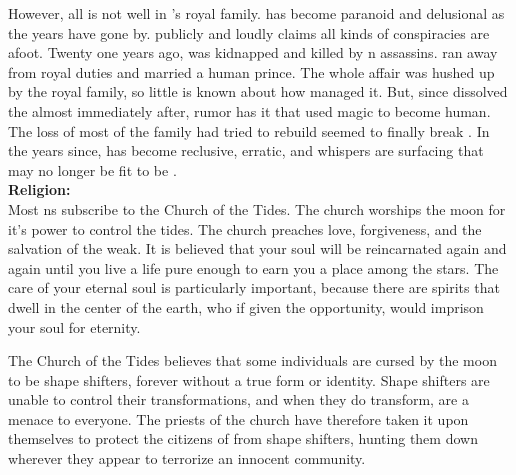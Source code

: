 \documentclass[blue]{NeptuneBall}
\begin{document}
However, all is not well in \pAtlantis{}'s royal family. \cPlant{\Prince} \cPlant{} has become paranoid and delusional as the years have gone by. \cPlant{\They} publicly and loudly claims all kinds of conspiracies are afoot. Twenty one years ago, \cQueen{\King} \cQueen{\MYname{}} was kidnapped and killed by \pPacifica{}n assassins. \cAriel{\Prince} \cAriel{} ran away from \cAriel{\their} royal duties and married a human prince. The whole affair was hushed up by the royal family, so little is known about how \cAriel{\they{}} managed it. But, since \cKing{} dissolved the \pMagician{} almost immediately after, rumor has it that \cAriel{\they} used magic to become human. The loss of most of the family \cKing{\they} had tried to rebuild seemed to finally break \cKing{\King} \cKing{}. In the years since, \cKing{\they{}} has become reclusive, erratic, and whispers are surfacing that \cKing{\they{}} may no longer be fit to be \cKing{\King}.\\

{\bf Religion:}\\
Most \pAtlantis{}ns subscribe to the Church of the Tides. The church worships the moon for it's power to control the tides. The church preaches love, forgiveness, and the salvation of the weak. It is believed that your soul will be reincarnated again and again until you live a life pure enough to earn you a place among the stars. The care of your eternal soul is particularly important, because there are spirits that dwell in the center of the earth, who if given the opportunity, would imprison your soul for eternity.

The Church of the Tides believes that some individuals are cursed by the moon to be shape shifters, forever without a true form or identity. Shape shifters are unable to control their transformations, and when they do transform, are a menace to everyone. The priests of the church have therefore taken it upon themselves to protect the citizens of \pAtlantis{} from shape shifters, hunting them down wherever they appear to terrorize an innocent community.\\
\end{document}

